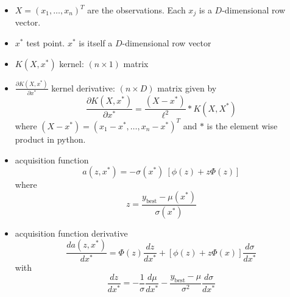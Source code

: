 \documentclass[11pt, oneside]{article}   	%
\begin{document}
\begin{itemize}
\item $X = (x_1, \dots, x_n)^T$ are the observations. Each $x_j$ is a $D$-dimensional row vector.
\item $x^*$ test point. $x^*$ is itself a $D$-dimensional row vector
\item $K(X, x^*)$ kernel: $(n \times 1)$ matrix
\item $\frac{\partial K(X, x^*)}{\partial x^*}$ kernel derivative: $(n \times D)$ matrix given by
\begin{equation}
\frac{\partial K(X, x^*)}{\partial x^*} = \frac{(X - x^*)}{\ell^2} * K(X, X^*)
\end{equation}
where $(X - x^*) = (x_1 - x^*, \dots, x_n - x^*)^T$ and $*$ is the element wise product in python.


\item acquisition function
$$ a(z, x^*) = -\sigma(x^*) \ \left[ \phi(z)  + z \Phi(z)\right]$$
where $$z=\frac{y_\text{best} - \mu(x^*)}{\sigma(x^*)}$$

\item acquisition function derivative
$$\frac{d{a(z, x^*)}}{d x^*} = \Phi(z) \frac{d z}{d x^*} + \left[\phi(z) +z \Phi(x)\right] \frac{d{\sigma}}{d x^*}$$
with
$$ \frac{d z}{d x^*} = -\frac{1}{\sigma} \frac{d \mu}{d x^*} - \frac{y_\text{best} - \mu}{\sigma^2} \frac{d{\sigma}}{d x^*}$$
\end{itemize}
\end{document}
